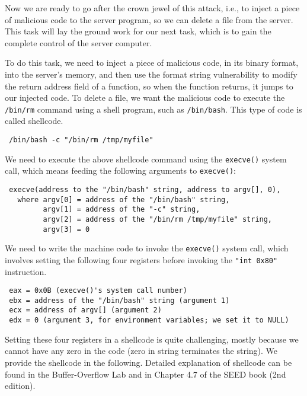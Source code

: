 Now we are ready to go after the crown jewel of this attack, i.e., to
inject a piece of malicious code to the server program, so we can delete 
a file from the server. This task will 
lay the ground work for our next task, which is to gain the complete control
of the server computer. 

To do this task, we need to inject a piece of malicious code, in its binary format, 
into the server's memory, and then use the format string vulnerability 
to modify the return address field of a function, so when the function returns, 
it jumps to our injected code. To delete a file, we want the 
malicious code to execute the \texttt{/bin/rm} command using a shell
program, such as \texttt{/bin/bash}. This type of code is called 
shellcode. 

\begin{lstlisting}
 /bin/bash -c "/bin/rm /tmp/myfile"
\end{lstlisting}
 
We need to execute the above shellcode command using the 
\texttt{execve()} system call, which means 
feeding the following arguments to \texttt{execve()}:

\begin{lstlisting}
 execve(address to the "/bin/bash" string, address to argv[], 0), 
   where argv[0] = address of the "/bin/bash" string,
         argv[1] = address of the "-c" string,
         argv[2] = address of the "/bin/rm /tmp/myfile" string,
         argv[3] = 0
\end{lstlisting}
 
We need to write the machine code to invoke the \texttt{execve()} 
system call, which involves setting the following four
registers before invoking the \texttt{"int 0x80"} instruction.  

\begin{lstlisting}
 eax = 0x0B (execve()'s system call number)
 ebx = address of the "/bin/bash" string (argument 1)
 ecx = address of argv[] (argument 2)
 edx = 0 (argument 3, for environment variables; we set it to NULL)
\end{lstlisting}


Setting these four registers in a shellcode is quite challenging, mostly
because we cannot have any zero in the code (zero in string terminates
the string).  We provide 
the shellcode in the following. Detailed explanation of shellcode can be found 
in the Buffer-Overflow Lab and in Chapter 4.7 of the SEED book (2nd edition).


